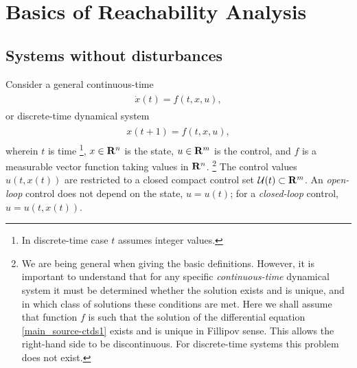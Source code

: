 \documentclass[letterpaper,10pt,english]{sphinxmanual}
\begin{document}
\section{Basics of Reachability Analysis}
\label{main_source:basics-of-reachability-analysis}

\subsection{Systems without disturbances}
\label{main_source:systems-without-disturbances}
Consider a general continuous-time
\label{main_source:equation-ctds1}\begin{gather}
\begin{split}\dot{x}(t) = f(t, x, u),\end{split}\label{main_source-ctds1}
\end{gather}
or discrete-time dynamical system
\label{main_source:equation-dtds1}\begin{gather}
\begin{split}x(t+1) = f(t, x, u),\end{split}\label{main_source-dtds1}
\end{gather}
wherein $t$ is time \footnote{
In discrete-time case $t$ assumes integer values.
}, $x\in{\bf R}^n$ is the state,
$u\in{\bf R}^m$ is the control, and $f$ is a measurable
vector function taking values in ${\bf R}^n$. \footnote{
We are being general when giving the basic definitions. However, it
is important to understand that for any specific \emph{continuous-time}
dynamical system it must be determined whether the solution exists
and is unique, and in which class of solutions these conditions are
met. Here we shall assume that function $f$ is such that the
solution of the differential equation \eqref{main_source-ctds1} exists and is unique
in Fillipov sense. This allows the right-hand side to be
discontinuous. For discrete-time systems this problem does not exist.
} The control
values $u(t, x(t))$ are restricted to a closed compact control set
${\mathcal U}(t)\subset{\bf R}^m$. An \emph{open-loop} control does not
depend on the state, $u=u(t)$; for a \emph{closed-loop} control,
$u=u(t, x(t))$.
\end{document}
